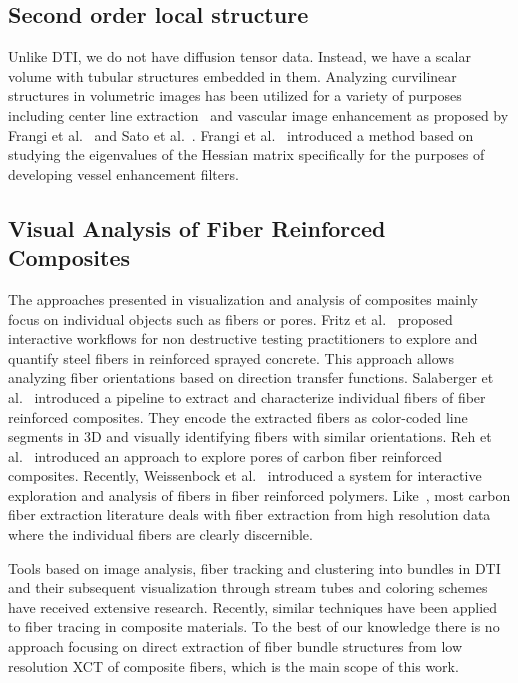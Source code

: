 \subsection{Second order local structure}
Unlike DTI, we do not have diffusion tensor data. Instead, we have a scalar volume with tubular structures embedded in them. Analyzing curvilinear structures in volumetric images has been utilized for a variety of purposes including center line extraction~\cite{Bouix2005} and vascular image enhancement as proposed by Frangi et al.~\cite{Frangi1998} and Sato et al.~\cite{Sato1997}. Frangi et al.~\cite{Frangi1998} introduced a method based on studying the eigenvalues of the  Hessian matrix specifically for the purposes of developing vessel enhancement filters.


\subsection {Visual Analysis of Fiber Reinforced Composites}
The approaches presented in visualization and analysis of composites mainly focus on individual objects such as fibers or pores. Fritz et al.~\cite{Fritz2009} proposed interactive workflows for non destructive testing practitioners to explore and quantify steel fibers in reinforced sprayed concrete. This approach allows analyzing fiber orientations based on direction transfer functions. Salaberger et al.~\cite{Salaberger2011} introduced a pipeline to extract and characterize individual fibers of fiber reinforced composites. They encode the extracted fibers as color-coded line segments in 3D and visually identifying fibers with similar orientations. Reh et al.~\cite{PMI_AR_2012} introduced an approach to explore pores of carbon fiber reinforced composites. Recently, Weissenbock et al.~\cite{Weissenbock2014} introduced a system for interactive exploration and analysis of fibers in fiber reinforced polymers. 
Like~\cite{Weissenbock2014}, most carbon fiber extraction literature deals with fiber extraction from high resolution data where the individual fibers are clearly discernible.

Tools based on image analysis, fiber tracking and clustering into bundles in DTI and their subsequent visualization through stream tubes and coloring schemes have received extensive research. Recently, similar techniques have been applied to fiber tracing in composite materials. To the best of our knowledge there is no approach focusing on direct extraction of fiber bundle structures from low resolution XCT of composite fibers, which is the main scope of this work.

